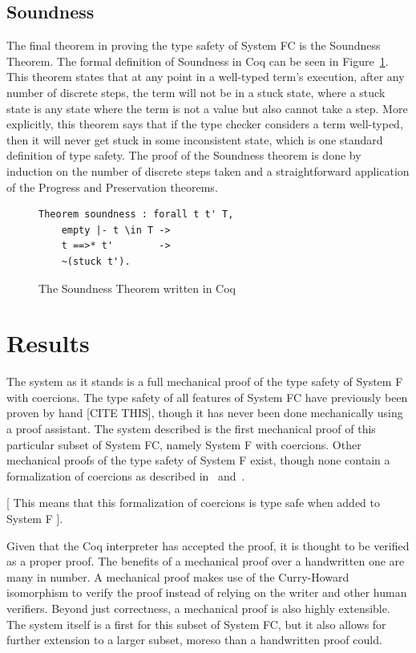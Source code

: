 \documentclass{sig-alternate}
\begin{document}
\subsection{Soundness}
\label{sec:implementation-soundness}

The final theorem in proving the type safety of System FC is the Soundness Theorem. The formal definition of Soundness in Coq can be seen in Figure~\ref{fig:soundness-coq}. This theorem states that at any point in a well-typed term's execution, after any number of discrete steps, the term will not be in a stuck state, where a stuck state is any state where the term is not a value but also cannot take a step. More explicitly, this theorem says that if the type checker considers a term well-typed, then it will never get stuck in some inconsistent state, which is one standard definition of type safety. The proof of the Soundness theorem is done by induction on the number of discrete steps taken and a straightforward application of the Progress and Preservation theorems.

\begin{figure}[h!]
\begin{lstlisting}
Theorem soundness : forall t t' T,
    empty |- t \in T ->
    t ==>* t'        ->
    ~(stuck t').
\end{lstlisting}
\caption{The Soundness Theorem written in Coq}
\label{fig:soundness-coq}
\end{figure}

\section{Results}
\label{sec:results}

The system as it stands is a full mechanical proof of the type safety of System F with coercions. The type safety of all features of System FC have previously been proven by hand [CITE THIS], though it has never been done mechanically using a proof assistant. The system described is the first mechanical proof of this particular subset of System FC, namely System F with coercions. Other mechanical proofs of the type safety of System F exist, though none contain a formalization of coercions as described in~\cite{Breitner:2014:SZC:2628136.2628141} and~\cite{DBLP:conf/tldi/YorgeyWCJVM12}.

[ This means that this formalization of coercions is type safe when added to System F ].

Given that the Coq interpreter has accepted the proof, it is thought to be verified as a proper proof. The benefits of a mechanical proof over a handwritten one are many in number. A mechanical proof makes use of the Curry-Howard isomorphism to verify the proof instead of relying on the writer and other human verifiers. Beyond just correctness, a mechanical proof is also highly extensible. The system itself is a first for this subset of System FC, but it also allows for further extension to a larger subset, moreso than a handwritten proof could. 
\end{document}
